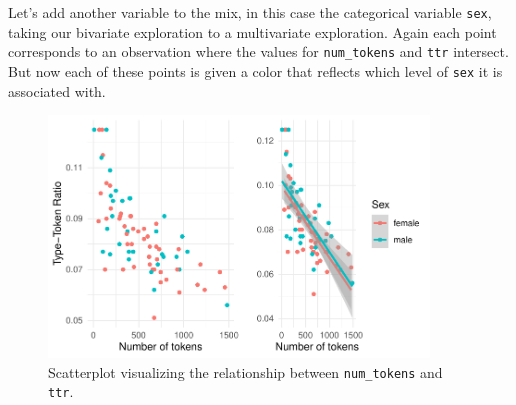 \documentclass[
  letterpaper,
]{latex/krantz}
\begin{document}
Let's add another variable to the mix, in this case the categorical
variable \texttt{sex}, taking our bivariate exploration to a
multivariate exploration. Again each point corresponds to an observation
where the values for \texttt{num\_tokens} and \texttt{ttr} intersect.
But now each of these points is given a color that reflects which level
of \texttt{sex} it is associated with.

\begin{figure}[h]

{\centering \includegraphics[width=0.9\textwidth,height=\textheight]{./approaching-analysis_files/figure-pdf/fig-summaries-multivariate-scatterplot-belc-1.pdf}

}

\caption{\label{fig-summaries-multivariate-scatterplot-belc}Scatterplot
visualizing the relationship between \texttt{num\_tokens} and
\texttt{ttr}.}

\end{figure}
\end{document}
